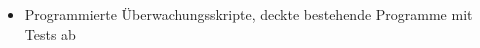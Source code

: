 \begin{itemize}
    \item Programmierte \"Uberwachungsskripte, deckte bestehende Programme mit Tests ab
\end{itemize}
